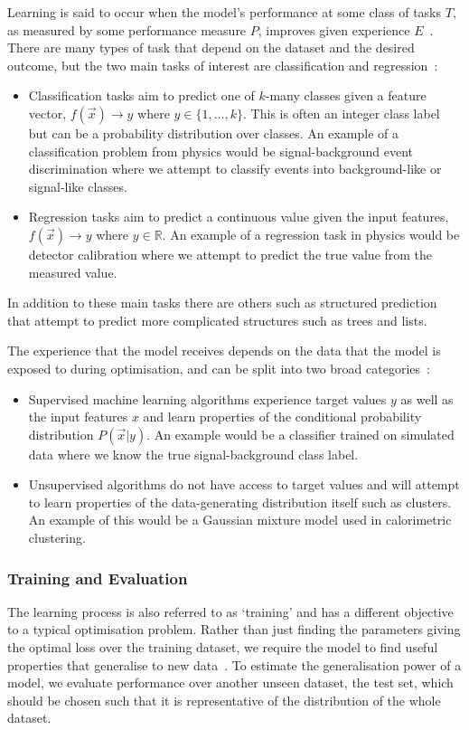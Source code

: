Learning is said to occur when the model's performance at some class of tasks $T$, as measured by some performance measure $P$, improves given experience $E$~\cite{Learning}.
There are many types of task that depend on the dataset and the desired outcome, but the two main tasks of interest are classification and regression~\cite{DeepLearningBook}:
\begin{itemize}[noitemsep]
    \item Classification tasks aim to predict one of $k$-many classes given a feature vector, $f(\vec{x})\rightarrow{}y$ where $y\in\{1,\dots,k\}$.
This is often an integer class label but can be a probability distribution over classes. An example of a classification problem from physics would be signal-background event discrimination where we attempt to classify events into background-like or signal-like classes.
    \item Regression tasks aim to predict a continuous value given the input features, $f(\vec{x})\rightarrow{}y$ where $y\in\mathds{R}$. An example of a regression task in physics would be detector calibration where we attempt to predict the true value from the measured value. 
\end{itemize}
In addition to these main tasks there are others such as structured prediction that attempt to predict more complicated structures such as trees and lists.


The experience that the model receives depends on the data that the model is exposed to during optimisation, and can be split into two broad categories~\cite{DeepLearningBook}:
\begin{itemize}[noitemsep]
    \item Supervised machine learning algorithms experience target values $y$ as well as the input features $x$ and learn properties of the conditional probability distribution $P(\vec{x}|y)$.  
          An example would be a classifier trained on simulated data where we know the true signal-background class label. 
    \item Unsupervised algorithms do not have access to target values and will attempt to learn properties of the data-generating distribution itself such as clusters.
          An example of this would be a Gaussian mixture model used in calorimetric clustering.
\end{itemize}



\subsubsection{Training and Evaluation}
The learning process is also referred to as `training' and has a different objective to a typical optimisation problem. Rather than just finding the parameters giving the optimal loss over the training dataset, we require the model to find useful properties that generalise to new data~\cite{DeepLearningBook}. 
To estimate the generalisation power of a model, we evaluate performance over another unseen dataset, the test set, which should be chosen such that it is representative of the distribution of the whole dataset.


